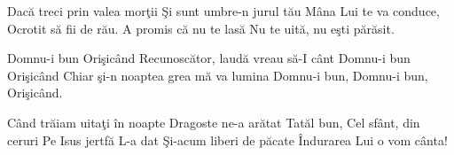 
\beginverse
Dacă treci prin valea morţii
Şi sunt umbre-n jurul tău
Mâna Lui te va conduce,
Ocrotit să fii de rău.
A promis că nu te lasă
Nu te uită, nu eşti părăsit.
\endverse

\beginchorus
Domnu-i bun Orişicând
Recunoscător, laudă vreau să-I cânt
Domnu-i bun Orişicând
Chiar şi-n noaptea grea mă va lumina
Domnu-i bun, Domnu-i bun, Orişicând.
\endchorus

\beginverse
Când trăiam uitaţi în noapte
Dragoste ne-a arătat
Tatăl bun, Cel sfânt, din ceruri
Pe Isus jertfă L-a dat
Şi-acum liberi de păcate
Îndurarea Lui o vom cânta! 
\endverse

\endsong

